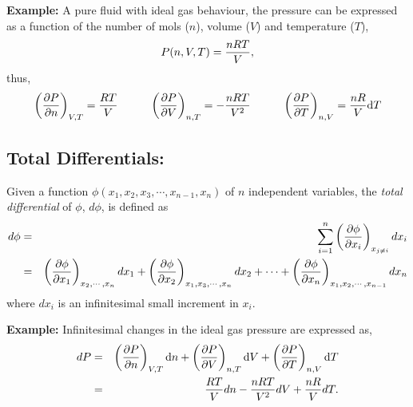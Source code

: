 {\bf Example:} A pure fluid with ideal gas behaviour, the pressure can be expressed as a function of the number of mols ($n$), volume ($V$) and temperature ($T$),
  \begin{displaymath}
     P(n,V,T) = \displaystyle\frac{n R T}{V},
  \end{displaymath}
thus,
  \begin{displaymath}
     \left(\displaystyle\frac{\partial P}{\partial n}\right)_{V,T} = \displaystyle\frac{RT}{V}\hspace{1cm} \left(\displaystyle\frac{\partial P}{\partial V}\right)_{n,T} = -\displaystyle\frac{n R T}{V^{2}} \hspace{1cm} \left(\displaystyle\frac{\partial P}{\partial T}\right)_{n,V} = \displaystyle\frac{n R}{V}\mathrm{d}{T}
  \end{displaymath}


\subsection{Total Differentials:}\label{Appendix_Calculus:TotalDifferential} Given a function $\phi\left(x_{1},x_{2},x_{3},\cdots,x_{n-1},x_{n}\right)$ of $n$ independent variables, the {\it total differential} of $\phi$, $d\phi$, is defined as
  \begin{eqnarray}
     d\phi &=& \sum\limits_{i=1}^{n}\left(\displaystyle\frac{\partial \phi}{\partial x_{i}}\right)_{x_{j\neq i}} d x_{i} \nonumber \\
     &=& \left(\displaystyle\frac{\partial\phi}{\partial x_{1}}\right)_{x_{2},\cdots,x_{n}} d x_{1} + \left(\displaystyle\frac{\partial\phi}{\partial x_{2}}\right)_{x_{1},x_{3},\cdots,x_{n}} dx_{2} + \cdots +  \left(\displaystyle\frac{\partial\phi}{\partial x_{n}}\right)_{x_{1},x_{2},\cdots,x_{n-1}} d x_{n} \nonumber 
  \end{eqnarray}
where $d x_{i}$ is an infinitesimal small increment in $x_{i}$.

\noindent
{\bf Example:} Infinitesimal changes in the ideal gas pressure are expressed as,
  \begin{eqnarray}
      d P &=& \left(\displaystyle\frac{\partial P}{\partial n}\right)_{V,T}\mathrm{d}{n} + \left(\displaystyle\frac{\partial P}{\partial V}\right)_{n,T}\mathrm{d}{V} + \left(\displaystyle\frac{\partial P}{\partial T}\right)_{n,V}\mathrm{d}{T} \nonumber \\
     &=& \displaystyle\frac{R T}{V} d n - \displaystyle\frac{n R T}{V^{2}} d V + \displaystyle\frac{n R}{V} d T. \nonumber 
  \end{eqnarray}


